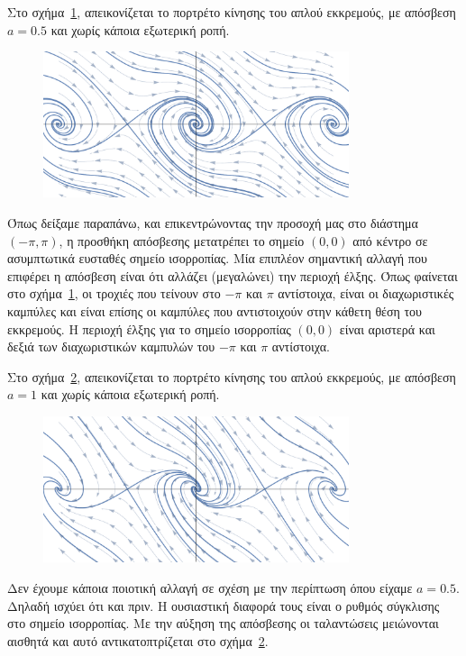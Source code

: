 \begin{solution}
    Στο σχήμα~\ref{fig:ex4_damped05Comb}, απεικονίζεται το πορτρέτο κίνησης
    του απλού εκκρεμούς, με απόσβεση \( a = 0.5 \) και χωρίς κάποια εξωτερική ροπή.
    \begin{figure}[h]
        \centering
        \includegraphics[width=0.8\textwidth]{figures/ex4_damped05Comb.pdf}
        \caption{}
        \label{fig:ex4_damped05Comb}
    \end{figure}
    Όπως δείξαμε παραπάνω, και επικεντρώνοντας την προσοχή μας στο διάστημα
    \( (-\pi,\pi) \), η προσθήκη απόσβεσης μετατρέπει το σημείο \( (0, 0) \) από
    κέντρο σε ασυμπτωτικά ευσταθές σημείο ισορροπίας. Μία επιπλέον σημαντική αλλαγή
    που επιφέρει η απόσβεση είναι ότι αλλάζει (μεγαλώνει) την περιοχή έλξης. Όπως
    φαίνεται στο σχήμα~\ref{fig:ex4_damped05Comb}, οι τροχιές που τείνουν στο
    \( -\pi \) και \( \pi \) αντίστοιχα, είναι οι διαχωριστικές καμπύλες και
    είναι επίσης οι καμπύλες που αντιστοιχούν στην κάθετη θέση του εκκρεμούς.
    Η περιοχή έλξης για το σημείο ισορροπίας \( (0, 0) \) είναι αριστερά και
    δεξιά των διαχωριστικών καμπυλών του \( -\pi \) και \( \pi \) αντίστοιχα.

    Στο σχήμα~\ref{fig:ex4_damped1Comb}, απεικονίζεται το πορτρέτο κίνησης
    του απλού εκκρεμούς, με απόσβεση \( a = 1 \) και χωρίς κάποια εξωτερική ροπή.
    \begin{figure}[h]
        \centering
        \includegraphics[width=0.8\textwidth]{figures/ex4_damped1Comb.pdf}
        \caption{}
        \label{fig:ex4_damped1Comb}
    \end{figure}
    Δεν έχουμε κάποια ποιοτική αλλαγή σε σχέση με την περίπτωση όπου είχαμε
    \( a = 0.5 \). Δηλαδή ισχύει ότι και πριν. Η ουσιαστική διαφορά τους είναι
    ο ρυθμός σύγκλισης στο σημείο ισορροπίας. Με την αύξηση της απόσβεσης οι
    ταλαντώσεις μειώνονται αισθητά και αυτό αντικατοπτρίζεται στο
    σχήμα~\ref{fig:ex4_damped1Comb}.


\end{solution}
